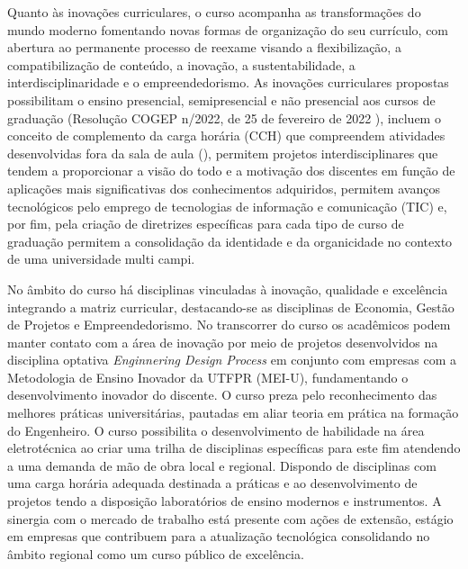 Quanto às inovações curriculares, o curso acompanha as transformações do mundo moderno fomentando novas formas de organização do seu currículo, com abertura ao permanente processo de reexame visando a flexibilização, a compatibilização de conteúdo, a inovação, a sustentabilidade, a interdisciplinaridade e o empreendedorismo.  As inovações curriculares propostas possibilitam o ensino presencial, semipresencial e não presencial aos cursos de graduação (Resolução COGEP n/2022, de 25 de fevereiro de 2022 \cite{cogep142}), incluem o conceito de complemento da carga horária (CCH) que compreendem atividades desenvolvidas fora da sala de aula (), permitem projetos interdisciplinares que tendem a proporcionar a visão do todo e a motivação dos discentes em função de aplicações mais significativas dos conhecimentos adquiridos, permitem avanços tecnológicos pelo emprego de tecnologias de informação e comunicação (TIC) e, por fim, pela criação de diretrizes específicas para cada tipo de curso de graduação permitem a consolidação da identidade e da organicidade no contexto de uma universidade multi campi.


No âmbito do curso há disciplinas vinculadas à inovação, qualidade e excelência integrando a matriz curricular, destacando-se as disciplinas de Economia, Gestão de Projetos e Empreendedorismo. No transcorrer do curso os acadêmicos podem manter contato com a área de inovação por meio de projetos desenvolvidos na disciplina optativa \textit{Enginnering Design Process} em conjunto com empresas com a Metodologia de Ensino Inovador da UTFPR (MEI-U), fundamentando o desenvolvimento inovador do discente. O curso preza pelo reconhecimento das melhores práticas universitárias, pautadas em aliar teoria em prática na formação do Engenheiro.  O curso possibilita o desenvolvimento de habilidade na área eletrotécnica ao criar uma trilha de disciplinas específicas para este fim atendendo a uma demanda de mão de obra local e regional. Dispondo de disciplinas com uma carga horária adequada destinada a práticas e ao desenvolvimento de projetos tendo a disposição laboratórios de ensino modernos e instrumentos. A sinergia com o mercado de trabalho está presente com ações de extensão, estágio em empresas que contribuem para a atualização tecnológica consolidando no âmbito regional como um curso público de excelência.

